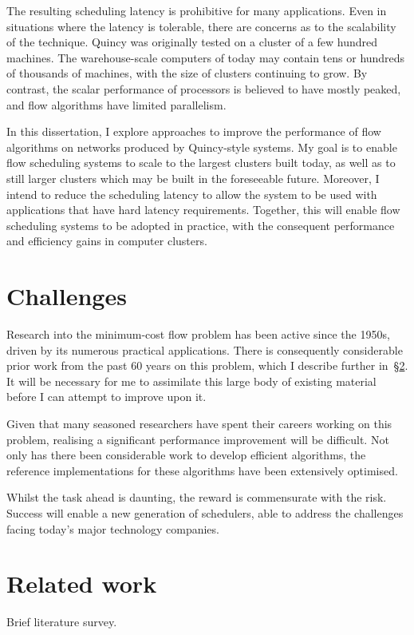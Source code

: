 The resulting scheduling latency is prohibitive for many applications. Even in situations where the latency is tolerable, there are concerns as to the scalability of the technique. Quincy was originally tested on a cluster of a few hundred machines. The warehouse-scale computers of today may contain tens or hundreds of thousands of machines, with the size of clusters continuing to grow. By contrast, the scalar performance of processors is believed to have mostly peaked, and flow algorithms have limited parallelism.

In this dissertation, I explore approaches to improve the performance of flow algorithms on networks produced by Quincy-style systems. My goal is to enable flow scheduling systems to scale to the largest clusters built today, as well as to still larger clusters which may be built in the foreseeable future. Moreover, I intend to reduce the scheduling latency to allow the system to be used with applications that have hard latency requirements. Together, this will enable flow scheduling systems to be adopted in practice, with the consequent performance and efficiency gains in computer clusters.

\section{Challenges} \label{sec:intro-challenges}
Research into the minimum-cost flow problem has been active since the 1950s, driven by its numerous practical applications. There is consequently considerable prior work from the past 60 years on this problem, which I describe further in~\S\ref{sec:intro-related-work}. It will be necessary for me to assimilate this large body of existing material before I can attempt to improve upon it.

Given that many seasoned researchers have spent their careers working on this problem, realising a significant performance improvement will be difficult. Not only has there been considerable work to develop efficient algorithms, the reference implementations for these algorithms have been extensively optimised.

Whilst the task ahead is daunting, the reward is commensurate with the risk. Success will enable a new generation of schedulers, able to address the challenges facing today's major technology companies.

\section{Related work} \label{sec:intro-related-work}
Brief literature survey.